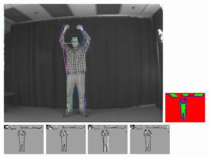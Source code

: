 \begin{figure}
\includegraphics[width=0.48 \linewidth]{output/2.detection/local_inference/out.s1.0100.d/thefinalparse.png}
\includegraphics[width=0.48 \linewidth]{output/2.detection/local_inference/out.s1.0100.d/local.x5.interior.png}
\includegraphics[width=0.24 \linewidth]{output/2.detection/local_inference/out.s1.0100.d/local.x5.orientations.0.png}
\includegraphics[width=0.24 \linewidth]{output/2.detection/local_inference/out.s1.0100.d/local.x5.orientations.1.png}
\includegraphics[width=0.24 \linewidth]{output/2.detection/local_inference/out.s1.0100.d/local.x5.orientations.2.png}
\includegraphics[width=0.24 \linewidth]{output/2.detection/local_inference/out.s1.0100.d/local.x5.orientations.3.png}


\end{figure}
